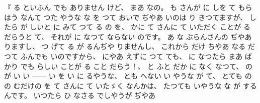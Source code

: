 %
『
る
といふん
でも
ありません
けど、
%
まあ
なの。
%
も
さんが
に
しを
て
もらはう
なんて
つた
やうな
な
を
%
つて
おいで
ぢやあ
いのは
り
きつてますが、
%
したら
が%
しいと
に
みて
つて
る
の
を、
%
かに
て
さんに
て
いただく%
ことが
る
だらうと
て、
%
それが
に
なつて
ならない
のです。
%
あ
な
ぶらんさんの
ぢやあ
りますし、
%
つ
げて
る
が
るんぢや
りませんし、
%
これから
だけ
ちやあ
なる
だつて
ふんでも
いのですから、
%
にやあ
えずに
つて
ても、
%
に
なつたら
まあ
%
ばかり
でも
らしい
ことが
る
こと
だらう！、
%
と
ふと
だか
に
なく
なつて、
%
の
が
い
い%
{---}{---}%
%
い
を
い
に
るやうな、
%
とも
へない
い
やうな
が
て、
%
とても
の
の
むだけの
を
て
さんに
て
いたゞく
なんかは、
%
たつても
いやうな
な
が
するんです。
%
いつたら
ひ
なさる
でしやうが
ぢやあ
%
